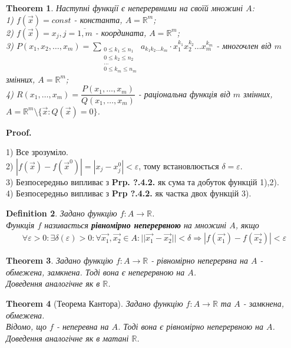 \documentclass[a4paper, 10pt]{article}
\makeatletter
\def\huge{\displaystyle}
\def\qed{$\blacksquare$}
\theoremstyle{theoremdd}
\newtheorem{theorem}{Theorem}[subsection]
\theoremstyle{theoremdd}
\newtheorem{definition}[theorem]{Definition}
\theoremstyle{theoremdd}
\theoremstyle{theoremdd}
\theoremstyle{theoremdd}
\theoremstyle{theoremdd}
\theoremstyle{theoremdd}
\theoremstyle{theoremdd}
\renewenvironment{proof}[1][Proof.\\]{\par
\pushQED{\hfill \qed}%
\normalfont \topsep6\p@\@plus6\p@\relax
\trivlist
\item\relax
{\bfseries
#1\@addpunct{.}}\hspace\labelsep\ignorespaces
}{%
\popQED\endtrivlist\@endpefalse
}
\makeatother
\begin{document}
\begin{theorem}
Наступні функції є неперервними на своїй множині $A$:\\
1) $f(\vec{x}) = const$ - константа, $A=\mathbb{R}^m$;\\
2) $f(\vec{x}) = x_j, j = \overline{1,m}$ - координата, $A=\mathbb{R}^m$;\\
3) $P(x_1,x_2,\dots,x_m) = \huge\sum_{\substack{0 \leq k_1 \leq n_1 \\ 0 \leq k_2 \leq n_2 \\ \dots \\ 0 \leq k_m \leq n_m}} a_{k_1 k_2 \dots k_m} \cdot x_1^{k_1} x_2^{k_2} \dots x_m^{k_m}$ - многочлен від $m$ змінних, $A=\mathbb{R}^m$;\medskip\\
4) $R(x_1,\dots,x_m) = \dfrac{P(x_1,\dots,x_m)}{Q(x_1,\dots,x_m)}$ - раціональна функція від $m$ змінних, $A = \mathbb{R}^m \setminus \{\vec{x}: Q(\vec{x}) = 0 \}$.
\end{theorem}

\begin{proof}
1) Все зрозуміло.
\bigskip \\
2) $|f(\vec{x}) - f(\vec{x}^0)| = |x_j - x_j^0| < \varepsilon$, тому встановлюється $\delta = \varepsilon$.
\bigskip \\
3) Безпосередньо випливає з \textbf{Prp. ?.4.2.} як сума та добуток функцій 1),2).
\bigskip \\
4) Безпосередньо випливає з \textbf{Prp ?.4.2.} як частка двох функцій 3).
\end{proof}

\begin{definition}
Задано функцію $f: A \to \mathbb{R}$.\\
Функція $f$ називається \textbf{рівномірно неперервною} на множині $A$, якщо
\begin{align*}
\forall \varepsilon > 0: \exists \delta(\varepsilon) > 0: \forall \vec{x_1}, \vec{x_2} \in A: ||\vec{x_1} - \vec{x_2}|| < \delta \Rightarrow |f(\vec{x_1}) - f(\vec{x_2})| < \varepsilon 
\end{align*}
\end{definition}

\begin{theorem}
Задано функцію $f: A \to \mathbb{R}$ - рівномірно неперервна на $A$ - обмежена, замкнена. Тоді вона є неперервною на $A$.\\
\textit{Доведення аналогічне як в $\mathbb{R}$.}
\end{theorem}

\begin{theorem}[Теорема Кантора]
Задано функцію $f: A \to \mathbb{R}$ та $A$ - замкнена, обмежена.\\
Відомо, що $f$ - неперевна на $A$. Тоді вона є рівномірно неперервною на $A$.\\
\textit{Доведення аналогічне як в матані $\mathbb{R}$.}
\end{theorem}
\newpage
\end{document}
